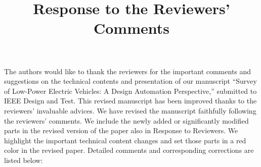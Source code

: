\documentclass[onecolumn]{IEEEconf}
\title{Response to the Reviewers' Comments}
\begin{document}
\maketitle


The authors would like to thank the reviewers for the important comments and suggestions on the technical contents and presentation of our manuscript ``Survey of Low-Power Electric Vehicles: A Design Automation Perspective,'' submitted to IEEE Design and Test. This revised manuscript has been  improved thanks to the reviewers’ invaluable advices. We have revised the manuscript faithfully following the reviewers’ comments. We include the newly added or significantly modified parts in the revised version of the paper also in Response to Reviewers. We highlight the important technical content changes and set those parts in a red color in the revised paper. Detailed comments and corresponding corrections are listed below:\\

\end{document}

